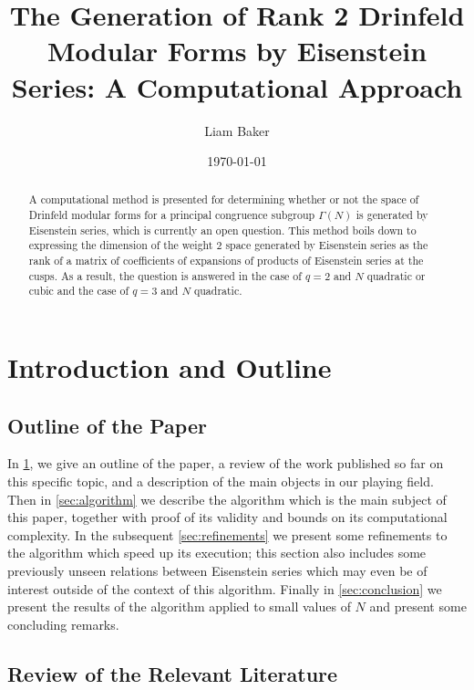 \documentclass{article}
\title{The Generation of Rank 2 Drinfeld Modular Forms by Eisenstein Series: A Computational Approach}
\author{Liam Baker}
\date{\today}
\begin{document}
 \maketitle

\begin{abstract}
  A computational method is presented for determining whether or not the space of Drinfeld modular forms for a principal congruence subgroup $\Gamma(N)$ is generated by Eisenstein series, which is currently an open question.
  This method boils down to expressing the dimension of the weight $2$ space generated by Eisenstein series as the rank of a matrix of coefficients of expansions of products of Eisenstein series at the cusps.
  As a result, the question is answered in the case of $q = 2$ and $N$ quadratic or cubic and the case of $q = 3$ and $N$ quadratic.
\end{abstract}


\section{Introduction and Outline} \label{sec:intro}

\subsection{Outline of the Paper} \label{ssec:outline}

In \cref{sec:intro}, we give an outline of the paper, a review of the work published so far on this specific topic, and a description of the main objects in our playing field.
Then in \cref{sec:algorithm} we describe the algorithm which is the main subject of this paper, together with proof of its validity and bounds on its computational complexity.
In the subsequent \cref{sec:refinements} we present some refinements to the algorithm which speed up its execution; this section also includes some previously unseen relations between Eisenstein series which may even be of interest outside of the context of this algorithm.
Finally in \cref{sec:conclusion} we present the results of the algorithm applied to small values of $N$ and present some concluding remarks.


\subsection{Review of the Relevant Literature} \label{ssec:review}
\end{document}
